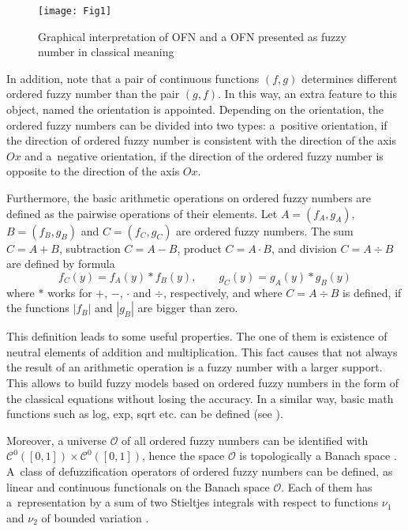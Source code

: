 \documentclass[review]{elsarticle}
\begin{document}
\begin{figure}[!ht]
\centering
\texttt{[image: Fig1]}
\vspace{-25pt}
\caption{Graphical interpretation of OFN and a OFN presented as fuzzy number in classical meaning}
\label{fig:1}
\end{figure}

In addition, note that a pair of continuous functions $(f,g)$ determines different ordered fuzzy number than the pair $(g,f)$. In this way, an extra feature to this object, named the orientation is appointed. Depending on the orientation, the ordered fuzzy numbers can be divided into two types: a~positive orientation, if the direction of ordered fuzzy number is consistent with the direction of the axis $Ox$ and a~negative orientation, if the direction of the ordered fuzzy number is opposite to the direction of the axis $Ox$.

Furthermore, the basic arithmetic operations on ordered fuzzy numbers are defined as the pairwise operations of their elements. Let $A=(f_A,g_A)$, \linebreak $B=(f_B,g_B)$ and $C=(f_C,g_C)$ are ordered fuzzy numbers. The sum \linebreak $C=A+B$, subtraction $C=A-B$, product $C= A\cdot B$, and division $C=A\div B$ are defined by formula
\begin{equation}
f_C(y)=f_A(y)\ast f_B(y),\qquad g_C(y)=g_A(y)\ast g_B(y)
\end{equation}
where $\ast$ works for $+$, $-$, $\cdot$ and $\div$, respectively, and where $C=A\div B$ is defined, if the functions $|f_B|$ and $|g_B|$ are bigger than zero. 

This definition leads to some useful properties. The one of them is existence of neutral elements of addition and multiplication. This fact causes that not always the result of an arithmetic operation is a fuzzy number with a larger support. This allows to build fuzzy models based on ordered fuzzy numbers in the form of the classical equations without losing the accuracy. In a similar way, basic math functions such as log, exp, sqrt etc. can be defined (see \cite{prokopowicz}).

Moreover, a universe $\mathcal{O}$ of all ordered fuzzy numbers can be identified with $\mathcal{C}^0([0,1])\times\mathcal{C}^0([0,1])$, hence the space $\mathcal{O}$ is topologically a Banach space \cite{kos2004}. A~class of defuzzification operators of ordered fuzzy numbers can be defined, as linear and continuous functionals on the Banach space $\mathcal{O}$. Each of them has a~representation by a sum of two Stieltjes integrals with respect to functions $\nu_1$ and $\nu_2$ of bounded variation \cite{kos2010,kos2013}.
\end{document}
